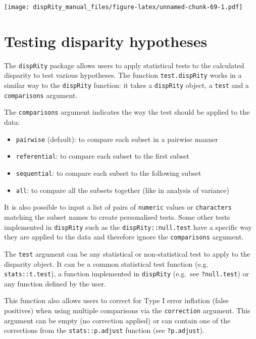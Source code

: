 \documentclass[]{book}
\providecommand{\tightlist}{%
  \setlength{\itemsep}{0pt}\setlength{\parskip}{0pt}}
\begin{document}
\texttt{[image: dispRity\_manual\_files/figure-latex/unnamed-chunk-69-1.pdf]}

\hypertarget{testing-disparity-hypotheses}{%
\section{Testing disparity hypotheses}\label{testing-disparity-hypotheses}}

The \texttt{dispRity} package allows users to apply statistical tests to the calculated disparity to test various hypotheses.
The function \texttt{test.dispRity} works in a similar way to the \texttt{dispRity} function: it takes a \texttt{dispRity} object, a \texttt{test} and a \texttt{comparisons} argument.

The \texttt{comparisons} argument indicates the way the test should be applied to the data:

\begin{itemize}
\tightlist
\item
  \texttt{pairwise} (default): to compare each subset in a pairwise manner
\item
  \texttt{referential}: to compare each subset to the first subset
\item
  \texttt{sequential}: to compare each subset to the following subset
\item
  \texttt{all}: to compare all the subsets together (like in analysis of variance)
\end{itemize}

It is also possible to input a list of pairs of \texttt{numeric} values or \texttt{characters} matching the subset names to create personalised tests.
Some other tests implemented in \texttt{dispRity} such as the \texttt{dispRity::null.test} have a specific way they are applied to the data and therefore ignore the \texttt{comparisons} argument.

The \texttt{test} argument can be any statistical or non-statistical test to apply to the disparity object.
It can be a common statistical test function (e.g. \texttt{stats::t.test}), a function implemented in \texttt{dispRity} (e.g.~see \texttt{?null.test}) or any function defined by the user.

This function also allows users to correct for Type I error inflation (false positives) when using multiple comparisons via the \texttt{correction} argument.
This argument can be empty (no correction applied) or can contain one of the corrections from the \texttt{stats::p.adjust} function (see \texttt{?p.adjust}).
\end{document}
